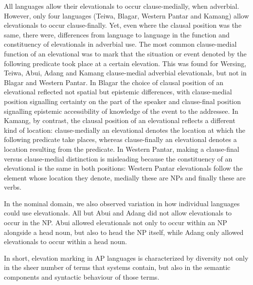 All languages allow their elevationals to occur clause-medially, when adverbial. However, only four languages (Teiwa, Blagar, Western Pantar and Kamang) allow elevationals to occur clause-finally. Yet, even where the clausal position was the same, there were, differences from language to language in the function and constituency of elevationals in adverbial use. The most common clause-medial function of an elevational was to mark that the situation or event denoted by the following predicate took place at a certain elevation. This was found for Wersing, Teiwa, Abui, Adang and Kamang clause-medial adverbial elevationals, but not in Blagar and Western Pantar. In Blagar the choice of clausal position of an elevational reflected not spatial but epistemic differences, with clause-medial position signalling certainty on the part of the speaker and clause-final position signalling epistemic accessibility of knowledge of the event to the addressee. In Kamang, by contrast, the clausal position of an elevational reflects a different kind of location: clause-medially an elevational denotes the location at which the following predicate take places, whereas clause-finally an elevational denotes a location resulting from the predicate. In Western Pantar, making a clause-final versus clause{}-medial distinction is misleading because the constituency of an elevational is the same in both positions: Western Pantar elevationals follow the element whose location they denote, medially these are NPs and finally these are verbs. 

In the nominal domain, we also observed variation in how individual languages could use elevationals. All but Abui and Adang did not allow elevationals to occur in the NP. Abui allowed elevationals not only to occur within an NP alongside a head noun, but also to head the NP itself, while Adang only allowed elevationals to occur within a head noun.

\newpage
In short, elevation marking in AP languages is characterized by diversity not only in the sheer number of terms that systems contain, but also in the semantic components and syntactic behaviour of those terms. 

